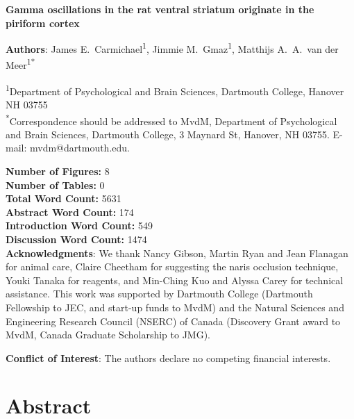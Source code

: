 \documentclass[11pt]{article}
\begin{document}
{\Large\bf Gamma oscillations in the rat ventral striatum originate in the piriform cortex}

{\bf Authors}: James E.\ Carmichael\textsuperscript{1}, Jimmie
M.\ Gmaz\textsuperscript{1}, Matthijs A.\ A.\ van der
Meer\textsuperscript{1*}

\textsuperscript{1}Department of Psychological and Brain Sciences,
Dartmouth College, Hanover NH
03755\\ %

\textsuperscript{*}Correspondence should be addressed to MvdM,
Department of Psychological and Brain Sciences, Dartmouth College, 3
Maynard St, Hanover, NH 03755. E-mail: {\sffamily mvdm@dartmouth.edu}.

\textbf{Number of Figures:} 8\\
\textbf{Number of Tables:} 0\\
\textbf{Total Word Count:} 5631\\
\textbf{Abstract Word Count:} 174\\
\textbf{Introduction Word Count:} 549\\
\textbf{Discussion Word Count:} 1474\\

\textbf{Acknowledgments}: We thank Nancy Gibson, Martin Ryan and Jean
Flanagan for animal care, Claire Cheetham for suggesting the naris
occlusion technique, Youki Tanaka for reagents, and Min-Ching Kuo and
Alyssa Carey for technical assistance. This work was supported by
Dartmouth College (Dartmouth Fellowship to JEC, and start-up funds to
MvdM) and the Natural Sciences and Engineering Research Council
(NSERC) of Canada (Discovery Grant award to MvdM, Canada Graduate
Scholarship to JMG).

\textbf{Conflict of Interest}: The authors declare no competing
financial interests.\\

\newpage
\linenumbers

\section*{Abstract}
\end{document}
